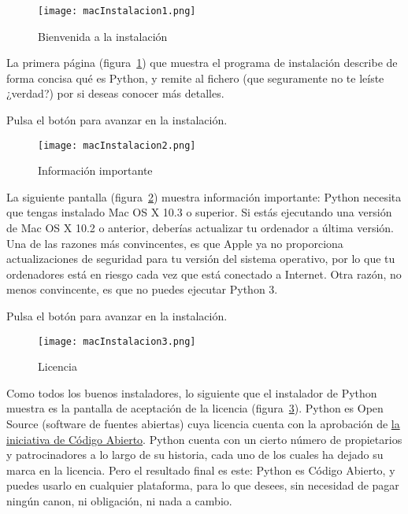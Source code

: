 \begin{figure}[!h]
  \begin{center}
\texttt{[image: macInstalacion1.png]}
\caption{Bienvenida a la instalación}\label{figm01}
  \end{center}
\end{figure}

La primera página (figura~\ref{figm01}) que muestra el programa de instalación describe de forma concisa qué es Python, y remite al fichero  (que seguramente no te leíste ¿verdad?) por si deseas conocer más detalles.

Pulsa el botón  para avanzar en la instalación.

\begin{figure}[!h]
  \begin{center}
\texttt{[image: macInstalacion2.png]}
\caption{Información importante}\label{figm02}
  \end{center}
\end{figure}

La siguiente pantalla (figura~\ref{figm02}) muestra información importante: Python necesita que tengas instalado Mac OS X 10.3 o superior. Si estás ejecutando una versión de Mac OS X 10.2 o anterior, deberías actualizar tu ordenador a última versión. Una de las razones más convincentes, es que Apple ya no proporciona actualizaciones de seguridad para tu versión del sistema operativo, por lo que tu ordenadores está en riesgo cada vez que está conectado a Internet. Otra razón, no menos convincente, es que no puedes ejecutar Python 3.

Pulsa el botón  para avanzar en la instalación.

\begin{figure}[!h]
  \begin{center}
\texttt{[image: macInstalacion3.png]}
\caption{Licencia}\label{figm03}
  \end{center}
\end{figure}

Como todos los buenos instaladores, lo siguiente que el instalador de Python muestra es la pantalla de aceptación de la licencia (figura~\ref{figm03}). Python es Open Source (software de fuentes abiertas) cuya licencia cuenta con la aprobación de \href{http://opensource.org/licenses/}{la iniciativa de Código Abierto}. Python cuenta con un cierto número de propietarios y patrocinadores a lo largo de su historia, cada uno de los cuales ha dejado su marca en la licencia. Pero el resultado final es este: Python es Código Abierto, y puedes usarlo en cualquier plataforma, para lo que desees, sin necesidad de pagar ningún canon, ni obligación, ni nada a cambio.

